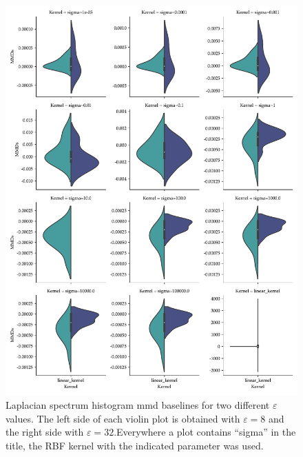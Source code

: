 \begin{figure}
  \centering
  \includegraphics[width=\textwidth]{./figures/results/laplacian_spectrum_baselines.pdf}
  \caption[Laplacian spectrum histogram \gls{mmd} baselines for two
different $\varepsilon$ values.]{Laplacian spectrum histogram \gls{mmd}
baselines for two different $\varepsilon$ values. The left side of each violin
plot is obtained with $\varepsilon=8$ and the right side with
$\varepsilon=32$.Everywhere a plot contains ``sigma'' in the title, the RBF
kernel with the indicated parameter was used.}
\end{figure}

